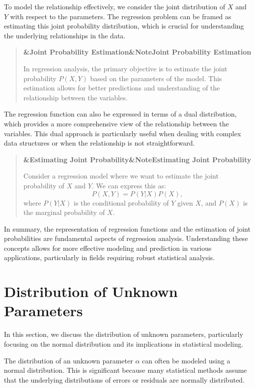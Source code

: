 \documentclass[a4paper]{article}
\newcommand{\boxheading}[1]{%
  \par\smallskip
  \noindent\textbf{\ifx&#1&Note\else#1\fi}\par
  \smallskip
}
\newenvironment{exbox}[1][]{%
  \begin{quote}\color{brown!70!black}\boxheading{#1}\normalcolor
}{\end{quote}}
\newenvironment{rembox}[1][]{%
  \begin{quote}\color{black!70}\boxheading{#1}\normalcolor
}{\end{quote}}
\begin{document}
To model the relationship effectively, we consider the joint distribution of \( X \) and \( Y \) with respect to the parameters. The regression problem can be framed as estimating this joint probability distribution, which is crucial for understanding the underlying relationships in the data.

\begin{rembox}[Joint Probability Estimation]
In regression analysis, the primary objective is to estimate the joint probability \( P(X, Y) \) based on the parameters of the model. This estimation allows for better predictions and understanding of the relationship between the variables.
\end{rembox}

The regression function can also be expressed in terms of a dual distribution, which provides a more comprehensive view of the relationship between the variables. This dual approach is particularly useful when dealing with complex data structures or when the relationship is not straightforward.

\begin{exbox}[Estimating Joint Probability]
Consider a regression model where we want to estimate the joint probability of \( X \) and \( Y \). We can express this as:
\[
P(X, Y) = P(Y | X) P(X),
\]
where \( P(Y | X) \) is the conditional probability of \( Y \) given \( X \), and \( P(X) \) is the marginal probability of \( X \).
\end{exbox}

In summary, the representation of regression functions and the estimation of joint probabilities are fundamental aspects of regression analysis. Understanding these concepts allows for more effective modeling and prediction in various applications, particularly in fields requiring robust statistical analysis.

\section{Distribution of Unknown Parameters}
In this section, we discuss the distribution of unknown parameters, particularly focusing on the normal distribution and its implications in statistical modeling.

The distribution of an unknown parameter \( \alpha \) can often be modeled using a normal distribution. This is significant because many statistical methods assume that the underlying distributions of errors or residuals are normally distributed. 
\end{document}
